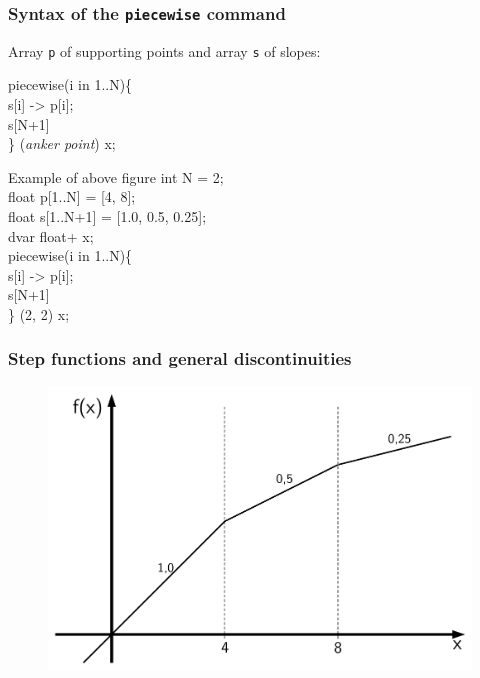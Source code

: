 \begin{frame}
 \frametitle{Syntax of the \texttt{piecewise} command}
 Array \texttt{p} of supporting points and array \texttt{s} of slopes:
 \begin{center}
  \begin{minipage}{.5\linewidth}
   \ttfamily
    piecewise(i in 1..N)\{\\
    \mbox{}\quad s[i] -> p[i];\\
    \mbox{}\quad s[N+1]\\
    \} (\textsf{\slshape anker point}) x;\\
  \end{minipage}
 \end{center}
 \vspace{-3ex}
 \begin{block}{Example of above figure}\ttfamily\footnotesize
  int N = 2;\\
  float p[1..N] = [4, 8];\\
  float s[1..N+1] = [1.0, 0.5, 0.25];\\
  dvar float+ x;\\[2ex]  
  piecewise(i in 1..N)\{\\
    \quad s[i] -> p[i];\\
    \quad s[N+1]\\
  \} (2, 2) x;\\
 \end{block}
\end{frame}

\begin{frame}
 \frametitle{Step functions and general discontinuities}
 \begin{figure}
  \centering
  \includegraphics[width=\linewidth,page=3]{Bilder/StueckweiseLineareFunktion3}
 \end{figure}
\end{frame}

